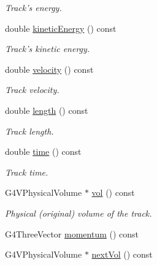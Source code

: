 \begin{DoxyCompactItemize}
\begin{DoxyCompactList}\small\item\em Track's energy. \item\end{DoxyCompactList}\item 
double \hyperlink{class_d_d4hep_1_1_simulation_1_1_geant4_track_handler_a7186b098fbff57fc9a547bff5602c1f5}{kineticEnergy} () const 
\begin{DoxyCompactList}\small\item\em Track's kinetic energy. \item\end{DoxyCompactList}\item 
double \hyperlink{class_d_d4hep_1_1_simulation_1_1_geant4_track_handler_a48537f6a5370efc3246fa3656412a677}{velocity} () const 
\begin{DoxyCompactList}\small\item\em Track velocity. \item\end{DoxyCompactList}\item 
double \hyperlink{class_d_d4hep_1_1_simulation_1_1_geant4_track_handler_a90e8a848e17758df7905f8506ee0c19d}{length} () const 
\begin{DoxyCompactList}\small\item\em Track length. \item\end{DoxyCompactList}\item 
double \hyperlink{class_d_d4hep_1_1_simulation_1_1_geant4_track_handler_af8197965eb41bea4f5653a334fca2b7d}{time} () const 
\begin{DoxyCompactList}\small\item\em Track time. \item\end{DoxyCompactList}\item 
G4VPhysicalVolume $\ast$ \hyperlink{class_d_d4hep_1_1_simulation_1_1_geant4_track_handler_abd177f86afc0aa606d25ddb60e7766d4}{vol} () const 
\begin{DoxyCompactList}\small\item\em Physical (original) volume of the track. \item\end{DoxyCompactList}\item 
G4ThreeVector \hyperlink{class_d_d4hep_1_1_simulation_1_1_geant4_track_handler_afa0618147c0860c4b003908cd24d26d9}{momentum} () const 
\item 
G4VPhysicalVolume $\ast$ \hyperlink{class_d_d4hep_1_1_simulation_1_1_geant4_track_handler_ab1fc24b8386fe9c128724f40ff10eea0}{nextVol} () const 

\end{DoxyCompactItemize}
